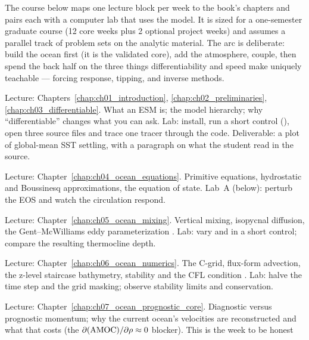 The course below maps one lecture block per week to the book's chapters and pairs each with a
computer lab that uses the model. It is sized for a one-semester graduate course (12 core weeks
plus 2 optional project weeks) and assumes a parallel track of problem sets on the analytic
material. The arc is deliberate: build the ocean first (it is the validated core), add the
atmosphere, couple, then spend the back half on the three things differentiability and speed make
uniquely teachable --- forcing response, tipping, and inverse methods.

\begin{description}[leftmargin=0pt,style=nextline]
  \item[\labweek{1} --- Orientation and the differentiable paradigm.]
    Lecture: Chapters~\ref{chap:ch01_introduction}, \ref{chap:ch02_preliminaries},
    \ref{chap:ch03_differentiable}. What an ESM is; the model hierarchy; why ``differentiable''
    changes what you can ask. Lab: install, run a short control
    (), open three source files and trace one tracer
    through the code. Deliverable: a plot of global-mean SST settling, with a paragraph on what
    the student read in the source.
  \item[\labweek{2} --- Ocean governing equations.]
    Lecture: Chapter~\ref{chap:ch04_ocean_equations}. Primitive equations, hydrostatic and
    Boussinesq approximations, the equation of state. Lab~A (below): perturb the EOS and watch the
    circulation respond.
  \item[\labweek{3} --- Ocean mixing and parameterization.]
    Lecture: Chapter~\ref{chap:ch05_ocean_mixing}. Vertical mixing, isopycnal diffusion, the
    Gent--McWilliams eddy parameterization \citep{gentmcwilliams1990}. Lab: vary 
    and  in a short control; compare the resulting thermocline depth.
  \item[\labweek{4} --- Ocean numerics.]
    Lecture: Chapter~\ref{chap:ch06_ocean_numerics}. The C-grid, flux-form advection, the
    z-level staircase bathymetry, stability and the CFL condition \citep{griffies2004}. Lab:
    halve the time step and the grid masking; observe stability limits and conservation.
  \item[\labweek{5} --- The prognostic ocean core.]
    Lecture: Chapter~\ref{chap:ch07_ocean_prognostic_core}. Diagnostic versus prognostic
    momentum; why the current ocean's velocities are reconstructed and what that costs
    (the $\partial(\text{AMOC})/\partial\rho\approx0$ blocker). This is the week to be honest

\end{description}
